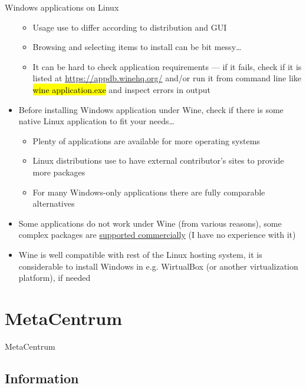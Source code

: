 \documentclass[compress, ucs, xelatex, 11pt, xcolor=svgnames,
  hyperref={
    bookmarks=true,
    unicode=true,
    colorlinks=true,
    pdftitle={Linux, command line and MetaCentrum},
    plainpages=false,
    pdfauthor={Vojtech Zeisek},
    pdfsubject={Course about use of Linux command line, writing shell scripts and using MetaCentrum of CESNET},
    pdfcreator={XeLaTeX},
    pdfkeywords={Linux, GNU, BASH, shell, command line, MetaCentrum},
    linkcolor=DarkRed,
    anchorcolor=DarkBlue,
    citecolor=Indigo,
    filecolor=NavyBlue,
    menucolor=DarkMagenta,
    urlcolor=DarkBlue,
    pdftex},
  url={hyphens, lowtilde} %
  ]{beamer}
\renewcommand{\texttt}[1]{\hl{\ttfamily #1}}
\begin{document}
\begin{frame}[allowframebreaks]{Windows applications on Linux}
\begin{itemize}
    \begin{itemize}
      \item Usage use to differ according to distribution and GUI
      \item Browsing and selecting items to install can be bit messy\ldots
      \item It can be hard to check application requirements --- if it fails, check if it is listed at \url{https://appdb.winehq.org/} and/or run it from command line like \texttt{wine application.exe} and inspect errors in output
    \end{itemize}
    \item Before installing Windows application under Wine, check if there is some native Linux application to fit your needs\ldots
    \begin{itemize}
      \item Plenty of applications are available for more operating systems
      \item Linux distributions use to have external contributor's sites to provide more packages
      \item For many Windows-only applications there are fully comparable alternatives
    \end{itemize}
    \item Some applications do not work under Wine (from various reasons), some complex packages are \href{https://www.codeweavers.com/}{supported commercially} (I have no experience with it)
    \item Wine is well compatible with rest of the Linux hosting system, it is considerable to install Windows in e.g. WirtualBox (or another virtualization platform), if needed
  \end{itemize}
\end{frame}

\section{MetaCentrum}

\begin{frame}{MetaCentrum}
  \tableofcontents[currentsection, sectionstyle=show/hide, hideothersubsections]
\end{frame}

\subsection{Information}
\end{document}
